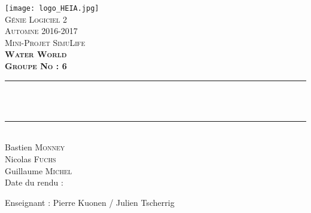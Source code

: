 \begin{titlepage}

\newcommand{\HRule}{\rule{\linewidth}{0.5mm}} %

\center %


\texttt{[image: logo\_HEIA.jpg]}\\[1.3cm]
\textsc{\Large Génie Logiciel 2 \\ [0.4cm]
\large Automne 2016-2017 \\ [0.4cm]
\large Mini-Projet SimuLife}\\[1.8cm] 


\textsc{
\bfseries \LARGE Water World\\ [0.8cm]
\Large Groupe No : 6}\\[1.4cm]


\HRule \\[0.4cm]
{ \huge \bfseries \Title }\\ 
\HRule \\[1.2cm]

\Large 
Bastien \textsc{Monney}\\[0cm]
Nicolas \textsc{Fuchs}\\[0cm]
Guillaume \textsc{Michel}\\[1.7cm] 

{\large Date du rendu : \daterendu}\\[1.5cm] 

\begin{center}
\large Enseignant : Pierre Kuonen / Julien Tscherrig
\end{center}

\end{titlepage}